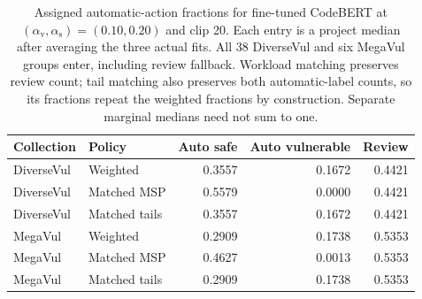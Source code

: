\begin{table}[htbp]\centering\small
\caption{Assigned automatic-action fractions for fine-tuned CodeBERT at $(\alpha_{\mathrm v},\alpha_{\mathrm s})=(0.10,0.20)$ and clip 20. Each entry is a project median after averaging the three actual fits. All 38 DiverseVul and six MegaVul groups enter, including review fallback. Workload matching preserves review count; tail matching also preserves both automatic-label counts, so its fractions repeat the weighted fractions by construction. Separate marginal medians need not sum to one.}
\label{tab:assignedactions}
\begin{tabular}{@{}llrrr@{}}\toprule Collection & Policy & Auto safe & Auto vulnerable & Review\\\midrule
DiverseVul & Weighted & 0.3557 & 0.1672 & 0.4421\\
DiverseVul & Matched MSP & 0.5579 & 0.0000 & 0.4421\\
DiverseVul & Matched tails & 0.3557 & 0.1672 & 0.4421\\
MegaVul & Weighted & 0.2909 & 0.1738 & 0.5353\\
MegaVul & Matched MSP & 0.4627 & 0.0013 & 0.5353\\
MegaVul & Matched tails & 0.2909 & 0.1738 & 0.5353\\
\bottomrule\end{tabular}\end{table}
